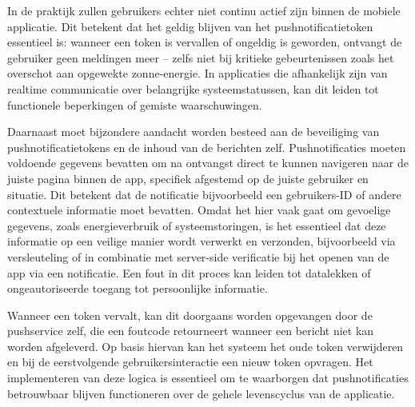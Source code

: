 In de praktijk zullen gebruikers echter niet continu actief zijn binnen de mobiele applicatie. Dit betekent dat het geldig blijven van het pushnotificatietoken essentieel is: wanneer een token is vervallen of ongeldig is geworden, ontvangt de gebruiker geen meldingen meer – zelfs niet bij kritieke gebeurtenissen zoals het overschot aan opgewekte zonne-energie. In applicaties die afhankelijk zijn van realtime communicatie over belangrijke systeemstatussen, kan dit leiden tot functionele beperkingen of gemiste waarschuwingen.

Daarnaast moet bijzondere aandacht worden besteed aan de beveiliging van pushnotificatietokens en de inhoud van de berichten zelf. Pushnotificaties moeten voldoende gegevens bevatten om na ontvangst direct te kunnen navigeren naar de juiste pagina binnen de app, specifiek afgestemd op de juiste gebruiker en situatie. Dit betekent dat de notificatie bijvoorbeeld een gebruikers-ID of andere contextuele informatie moet bevatten. Omdat het hier vaak gaat om gevoelige gegevens, zoals energieverbruik of systeemstoringen, is het essentieel dat deze informatie op een veilige manier wordt verwerkt en verzonden, bijvoorbeeld via versleuteling of in combinatie met server-side verificatie bij het openen van de app via een notificatie. Een fout in dit proces kan leiden tot datalekken of ongeautoriseerde toegang tot persoonlijke informatie.

Wanneer een token vervalt, kan dit doorgaans worden opgevangen door de pushservice zelf, die een foutcode retourneert wanneer een bericht niet kan worden afgeleverd. Op basis hiervan kan het systeem het oude token verwijderen en bij de eerstvolgende gebruikersinteractie een nieuw token opvragen. Het implementeren van deze logica is essentieel om te waarborgen dat pushnotificaties betrouwbaar blijven functioneren over de gehele levenscyclus van de applicatie.




